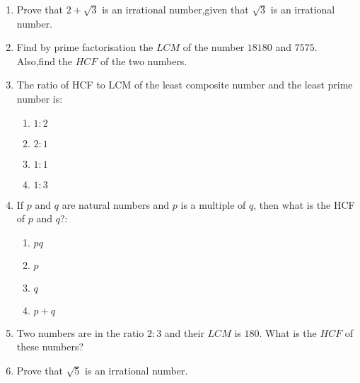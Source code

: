 
\begin{enumerate}

\item Prove that $ 2+\sqrt3 $ is an irrational number,given that $ \sqrt3 $ is an irrational number.

\item Find by prime factorisation the $LCM$ of the number $18180$ and $7575$. Also,find the $HCF$ of the two numbers.

\item The ratio of HCF to LCM of the least composite number and the least prime number is:

	\begin{enumerate}
	\item $1:2$
	\item $2:1$
	\item $1:1$
	\item $1:3$
\end{enumerate}
\item If $p$ and $q$ are natural numbers and $p$ is a multiple of $q$, then what is the HCF of $p$ and $q$?:
\begin{enumerate}
\item $ pq $  
\item $ p $                                        
\item $ q $                              
\item $ p+q $
\end{enumerate}  
\item
Two numbers are in the ratio $2:3$ and their $LCM$ is $180$. What is the $HCF$ of these numbers?
\item
Prove that $\sqrt{5}$ is an irrational number.



\end{enumerate}

